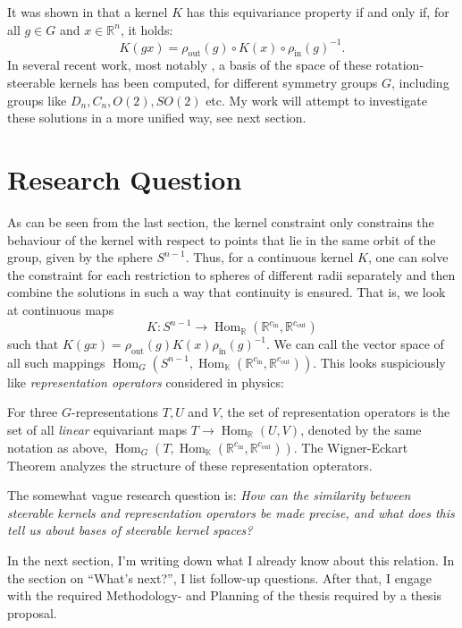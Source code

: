 \documentclass[12pt, a4paper]{article}
\theoremstyle{plain}
\theoremstyle{definition}
\theoremstyle{remark}
\newcommand{\R}{\mathds{R}}
\newcommand{\K}{\mathds{K}}
\DeclareMathOperator{\Hom}{Hom}
\DeclareMathOperator{\inn}{in}
\DeclareMathOperator{\out}{out}
\begin{document}
It was shown in \cite{3d_cnns} that a kernel $K$ has this equivariance property if and only if, for all $g \in G$ and $x \in \R^n$, it holds:
\begin{equation*}
K(gx) = \rho_{\out}(g)  \circ K(x) \circ \rho_{\inn}(g)^{-1}.
\end{equation*}
In several recent work, most notably \cite{general_e2_cnns}, a basis of the space of these rotation-steerable kernels has been computed, for different symmetry groups $G$, including groups like $D_n, C_n, O(2), SO(2)$ etc. My work will attempt to investigate these solutions in a more unified way, see next section.

\section{Research Question}

As can be seen from the last section, the kernel constraint only constrains the behaviour of the kernel with respect to points that lie in the same orbit of the group, given by the sphere $S^{n-1}$. Thus, for a continuous kernel $K$, one can solve the constraint for each restriction to spheres of different radii separately and then combine the solutions in such a way that continuity is ensured. That is, we look at continuous maps
\begin{equation*}
K: S^{n-1} \to \Hom_{\R}(\R^{c_{\inn}}, \R^{c_{\out}})
\end{equation*}
such that $K(gx) = \rho_{\out}(g) K(x) \rho_{\inn}(g)^{-1}$. We can call the vector space of all such mappings $\Hom_G(S^{n-1}, \Hom_{\K}(\R^{c_{\inn}}, \R^{c_{\out}}))$. This looks suspiciously like \emph{representation operators} considered in physics:

For three $G$-representations $T, U$ and $V$, the set of representation operators is the set of all \emph{linear} equivariant maps $T \to \Hom_{\R}(U, V)$, denoted by the same notation as above, $\Hom_{G}(T, \Hom_{\K}(\R^{c_{\inn}}, \R^{c_{\out}}))$. The Wigner-Eckart Theorem \cite{wigner-eckart} analyzes the structure of these representation opterators. 

The somewhat vague research question is: \emph{How can the similarity between steerable kernels and representation operators be made precise, and what does this tell us about bases of steerable kernel spaces?}

In the next section, I'm writing down what I already know about this relation. In the section on ``What's next?'', I list follow-up questions. After that, I engage with the required Methodology- and Planning of the thesis required by a thesis proposal.
\end{document}
